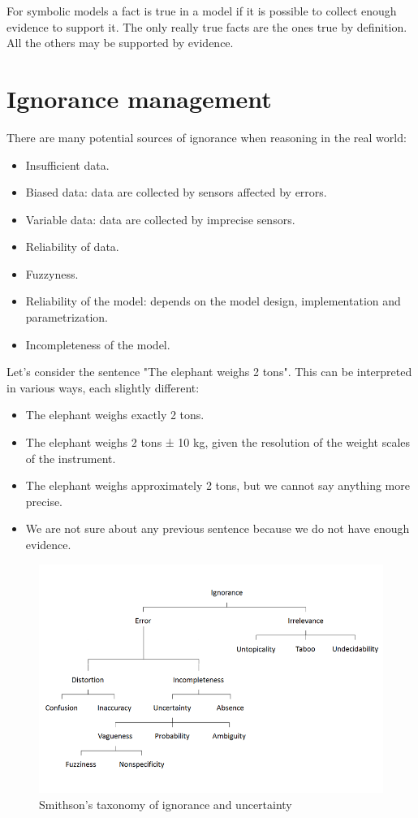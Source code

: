 \documentclass[12pt, a4paper]{report}
\newtheorem[L]{theorem}{Theorem}
\newtheorem[M]{corollary}{Corollary}
\newtheorem[M]{lemma}{Lemma}
\newtheorem[style=S,bodystyle=\normalfont]{definition}{Definition}
\begin{document}
    For symbolic models a fact is true in a model if it is possible to collect enough evidence to support it. The only really true facts 
    are the ones true by definition. All the others may be supported by evidence. 
    
    \section{Ignorance management}
    There are many potential sources of ignorance when reasoning in the real world:
    \begin{itemize}
        \item Insufficient data.
        \item Biased data: data are collected by sensors affected by errors. 
        \item Variable data: data are collected by imprecise sensors.
        \item Reliability of data. 
        \item Fuzzyness. 
        \item Reliability of the model: depends on the model design, implementation and parametrization. 
        \item Incompleteness of the model. 
    \end{itemize}
    \begin{example}
        Let’s consider the sentence "The elephant weighs 2 tons". This can be interpreted in various ways, each slightly different:
        \begin{itemize}
            \item The elephant weighs exactly 2 tons.
            \item The elephant weighs 2 tons ± 10 kg, given the resolution of the weight scales of the instrument.
            \item The elephant weighs approximately 2 tons, but we cannot say anything more precise.
            \item We are not sure about any previous sentence because we do not have enough evidence.
        \end{itemize}
    \end{example}
    \begin{figure}[H]
        \centering
        \includegraphics[width=1\linewidth]{images/smithson.png}
        \caption{Smithson's taxonomy of ignorance and uncertainty}
    \end{figure}
\end{document}
